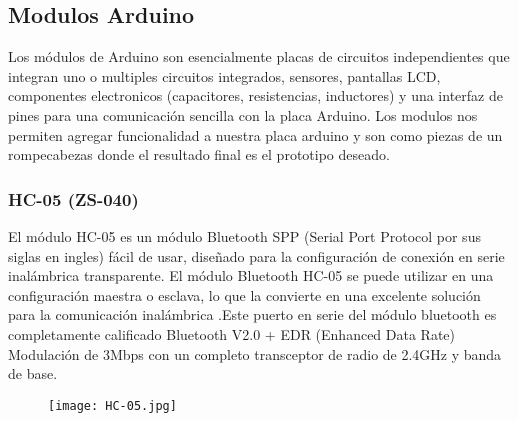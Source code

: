 \subsection{Modulos Arduino}
	\par 
		Los módulos de Arduino son esencialmente placas de circuitos independientes que integran uno o multiples circuitos integrados, sensores, pantallas LCD, componentes electronicos (capacitores, resistencias, inductores) y una interfaz de pines para una comunicación sencilla con la placa Arduino. Los modulos nos permiten agregar funcionalidad a nuestra placa arduino y son como piezas de un rompecabezas donde el resultado final es el prototipo deseado.
	
		\subsubsection{HC-05 (ZS-040)} 
			\par 
				El módulo HC-05 es un módulo Bluetooth SPP (Serial Port Protocol por sus siglas en ingles) fácil de usar, diseñado para la configuración de conexión en serie inalámbrica transparente. El módulo Bluetooth HC-05 se puede utilizar en una configuración maestra o esclava, lo que la convierte en una excelente solución para la comunicación inalámbrica .Este puerto en serie del módulo bluetooth es completamente calificado Bluetooth V2.0 + EDR (Enhanced Data Rate) Modulación de 3Mbps con un completo transceptor de radio de 2.4GHz y banda de base. 
		
				\begin{figure}[h]
					\centering
					\texttt{[image: HC-05.jpg]}
					\caption{}
				\end{figure}